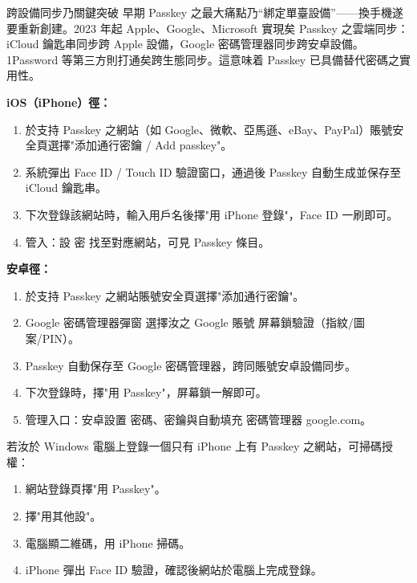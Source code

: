 \begin{tcbinfo}{跨設備同步乃關鍵突破}
早期 Passkey 之最大痛點乃“綁定單臺設備”——換手機遂要重新創建。2023 年起 Apple、Google、Microsoft 實現矣 Passkey 之雲端同步：iCloud 鑰匙串同步跨 Apple 設備，Google 密碼管理器同步跨安卓設備。1Password 等第三方則打通矣跨生態同步。這意味着 Passkey 已具備替代密碼之實用性。

\end{tcbinfo}


\textbf{iOS（iPhone）徑：}

\begin{enumerate}
  \item 於支持 Passkey 之網站（如 Google、微軟、亞馬遜、eBay、PayPal）賬號安全頁選擇"添加通行密鑰 / Add passkey"。
  \item 系統彈出 Face ID / Touch ID 驗證窗口，通過後 Passkey 自動生成並保存至 iCloud 鑰匙串。
  \item 下次登錄該網站時，輸入用戶名後擇"用 iPhone 登錄"，Face ID 一刷即可。
  \item 管入：設 密 找至對應網站，可見 Passkey 條目。
\end{enumerate}

\textbf{安卓徑：}

\begin{enumerate}
  \item 於支持 Passkey 之網站賬號安全頁選擇"添加通行密鑰"。
  \item Google 密碼管理器彈窗 選擇汝之 Google 賬號 屏幕鎖驗證（指紋/圖案/PIN）。
  \item Passkey 自動保存至 Google 密碼管理器，跨同賬號安卓設備同步。
  \item 下次登錄時，擇"用 Passkey"，屏幕鎖一解即可。
  \item 管理入口：安卓設置 密碼、密鑰與自動填充 密碼管理器 google.com。
\end{enumerate}


若汝於 Windows 電腦上登錄一個只有 iPhone 上有 Passkey 之網站，可掃碼授權：

\begin{enumerate}
  \item 網站登錄頁擇"用 Passkey"。
  \item 擇"用其他設"。
  \item 電腦顯二維碼，用 iPhone 掃碼。
  \item iPhone 彈出 Face ID 驗證，確認後網站於電腦上完成登錄。
\end{enumerate}

